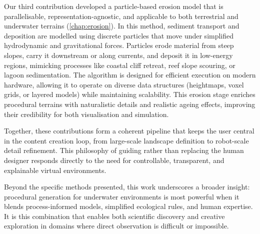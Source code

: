 Our third contribution developed a particle-based erosion model that is parallelisable, representation-agnostic, and applicable to both terrestrial and underwater terrains (\cref{chap:erosion}). In this method, sediment transport and deposition are modelled using discrete particles that move under simplified hydrodynamic and gravitational forces. Particles erode material from steep slopes, carry it downstream or along currents, and deposit it in low-energy regions, mimicking processes like coastal cliff retreat, reef slope scouring, or lagoon sedimentation. The algorithm is designed for efficient execution on modern hardware, allowing it to operate on diverse data structures (heightmaps, voxel grids, or layered models) while maintaining scalability. This erosion stage enriches procedural terrains with naturalistic details and realistic ageing effects, improving their credibility for both visualisation and simulation.

Together, these contributions form a coherent pipeline that keeps the user central in the content creation loop, from large-scale landscape definition to robot-scale detail refinement. This philosophy of guiding rather than replacing the human designer responds directly to the need for controllable, transparent, and explainable virtual environments.

Beyond the specific methods presented, this work underscores a broader insight: procedural generation for underwater environments is most powerful when it blends process-informed models, simplified ecological rules, and human expertise. It is this combination that enables both scientific discovery and creative exploration in domains where direct observation is difficult or impossible.







